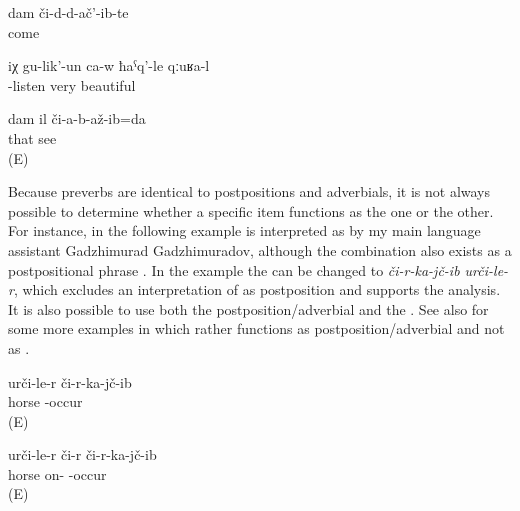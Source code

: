 \begin{exe}
	\ex	\label{ex:(It is enough what) I experienced verbs@2}
	\gll	dam	či-d-d-ač'-ib-te\\
			come\\
	\glt	{}

	\ex	\label{ex:He is listening carefully to him verbs@3}
	\gll	iχ	gu-lik'-un	ca-w	ħaˁq'-le	qːuʁa-l\\
			-listen		very	beautiful\\
	\glt	{}

	\ex	\label{ex:I did not see it. [There is no lock}
	\gll	dam	il	či-a-b-až-ib=da\\
			that	see\\
	\glt	{} (E)
\end{exe}

Because preverbs are identical to postpositions and adverbials, it is not always possible to determine whether a specific item functions as the one or the other. For instance,  in the following example  is interpreted as  by my main language assistant Gadzhimurad Gadzhimuradov, although the combination  also exists as a postpositional phrase . In the example  the  can be changed to \textit{či-r-ka-jč-ib urči-le-r}, which excludes an interpretation of  as postposition and supports the  analysis. It is also possible to use both the postposition/adverbial and the  . See also  for some more examples in which  rather functions as postposition/adverbial and not as .

\begin{exe}
	\ex	\label{ex:He fell from the horse verbs}
	\gll	urči-le-r	či-r-ka-jč-ib\\
		horse	-occur\\
	\glt	{} (E)
	
		\ex	\label{ex:He fell from the horse verbs_1}
	\gll	urči-le-r či-r	či-r-ka-jč-ib\\
		horse on- -occur\\
	\glt	{} (E)
	
\end{exe}

